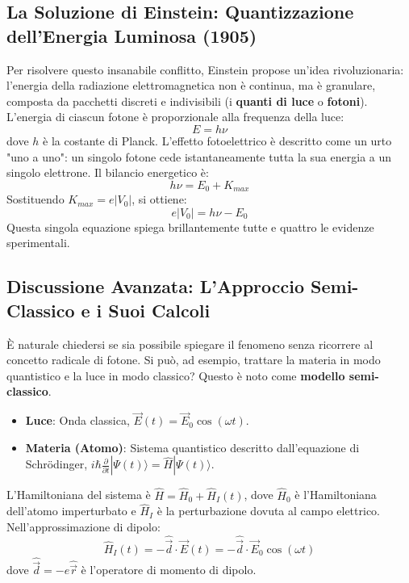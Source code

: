 \subsection{La Soluzione di Einstein: Quantizzazione dell'Energia Luminosa (1905)}

Per risolvere questo insanabile conflitto, Einstein propose un'idea rivoluzionaria: l'energia della radiazione elettromagnetica non è continua, ma è granulare, composta da pacchetti discreti e indivisibili (i \textbf{quanti di luce} o \textbf{fotoni}). L'energia di ciascun fotone è proporzionale alla frequenza della luce:
\begin{equation}
E = h\nu
\end{equation}
dove $h$ è la costante di Planck. L'effetto fotoelettrico è descritto come un urto "uno a uno": un singolo fotone cede istantaneamente tutta la sua energia a un singolo elettrone. Il bilancio energetico è:
\begin{equation}
\label{eq:photoelectric}
h\nu = E_0 + K_{max}
\end{equation}
Sostituendo $K_{max} = e|V_0|$, si ottiene:
\begin{equation}
e|V_0| = h\nu - E_0
\end{equation}
Questa singola equazione spiega brillantemente tutte e quattro le evidenze sperimentali.

\subsection{Discussione Avanzata: L'Approccio Semi-Classico e i Suoi Calcoli}

È naturale chiedersi se sia possibile spiegare il fenomeno senza ricorrere al concetto radicale di fotone. Si può, ad esempio, trattare la materia in modo quantistico e la luce in modo classico? Questo è noto come \textbf{modello semi-classico}.

\begin{itemize}
    \item \textbf{Luce}: Onda classica, $\vec{E}(t) = \vec{E}_0 \cos(\omega t)$.
    \item \textbf{Materia (Atomo)}: Sistema quantistico descritto dall'equazione di Schrödinger, $i\hbar \frac{\partial}{\partial t} |\Psi(t)\rangle = \hat{H} |\Psi(t)\rangle$.
\end{itemize}
L'Hamiltoniana del sistema è $\hat{H} = \hat{H}_0 + \hat{H}_I(t)$, dove $\hat{H}_0$ è l'Hamiltoniana dell'atomo imperturbato e $\hat{H}_I$ è la perturbazione dovuta al campo elettrico. Nell'approssimazione di dipolo:
\begin{equation}
\hat{H}_I(t) = - \hat{\vec{d}} \cdot \vec{E}(t) = - \hat{\vec{d}} \cdot \vec{E}_0 \cos(\omega t)
\end{equation}
dove $\hat{\vec{d}} = -e\hat{\vec{r}}$ è l'operatore di momento di dipolo.

